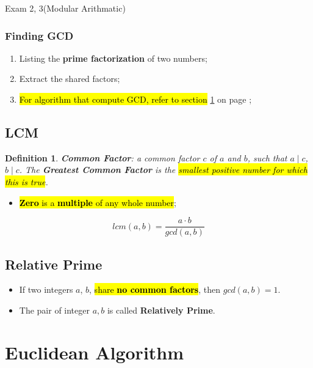 \documentclass{note}
\newtheorem{definition}{Definition}
\begin{document}
\begin{note}{Exam 2, 3(Modular Arithmatic)}
        \subsubsection{Finding GCD}
        \begin{enumerate}
            \item Listing the \textbf{prime factorization} of two numbers;
            \item Extract the shared factors;
            \item \hl{For algorithm that compute GCD, refer to section} \ref{sec euclidean algorithm} on page
            \pageref{sec euclidean algorithm};
        \end{enumerate}

        \subsection{LCM}

        \begin{definition}
            \textbf{Common Factor}: a common factor $ c $ of $ a $ and $ b $, such that $ a \mid c $, $ b \mid c $.
            The \textbf{Greatest Common Factor} is the \hl{smallest positive number for which this is true}.
        \end{definition}

        \begin{itemize}
            \item \hl{\textbf{Zero} is a \textbf{multiple} of any whole number};
        \end{itemize}

        \begin{equation}
            lcm \left(a, b\right) = \frac{a \cdot b}{gcd \left(a, b \right)}
        \end{equation}

        \subsection{Relative Prime}
        \begin{itemize}
            \item If two integers $ a $, $ b $, \hl{share \textbf{no common factors}}, then
            $ gcd \left( a, b \right) = 1$.
            \item The pair of integer $ a, b $ is called \textbf{Relatively Prime}.
        \end{itemize}

        \section{Euclidean Algorithm}\label{sec euclidean algorithm}


\end{note}
\end{document}
